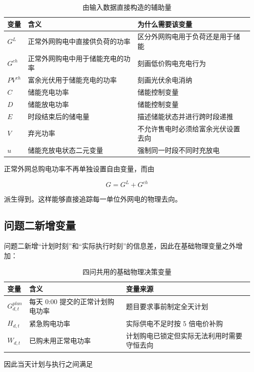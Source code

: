 \begin{table}[H]
\centering
{}
\begin{tabular}{lll}
\toprule
变量 & 含义 & 为什么需要该变量 \\
\midrule
\(G^L\) & 正常外网购电中直接供负荷的功率 & 区分外网购电用于负荷还是用于储能 \\
\(G^{ch}\) & 正常外网购电中用于储能充电的功率 & 刻画低价购电充电行为 \\
\(PV^{ch}\) & 富余光伏用于储能充电的功率 & 刻画光伏余电消纳 \\
\(C\) & 储能充电功率 & 储能控制变量 \\
\(D\) & 储能放电功率 & 储能控制变量 \\
\(E\) & 时段结束后的储电量 & 描述储能状态并进行跨时段递推 \\
\(V\) & 弃光功率 & 不允许售电时必须给富余光伏设置去向 \\
\(u\) & 储能充放电状态二元变量 & 强制同一时段不同时充放电 \\
\bottomrule
\end{tabular}
\caption{由输入数据直接构造的辅助量}
\label{tab:3}
\end{table}

正常外网总购电功率不再单独设置自由变量，而由

\[
G=G^L+G^{ch}
\]

派生得到。这样能够直接追踪每一单位外网电的物理去向。

\subsection{问题二新增变量}

问题二新增“计划时刻”和“实际执行时刻”的信息差，因此在基础物理变量之外增加：

\begin{table}[H]
\centering
{}
\begin{tabular}{lll}
\toprule
变量 & 含义 & 变量来源 \\
\midrule
\(G^{plan}_{d,t}\) & 每天 0:00 提交的正常计划购电功率 & 题目要求事前制定全天计划 \\
\(H_{d,t}\) & 紧急购电功率 & 实际供电不足时按 5 倍电价补购 \\
\(W_{d,t}\) & 已购未用正常电功率 & 计划购电已锁定但实际无法利用时需要守恒去向 \\
\bottomrule
\end{tabular}
\caption{四问共用的基础物理决策变量}
\label{tab:4}
\end{table}

因此当天计划与执行之间满足

